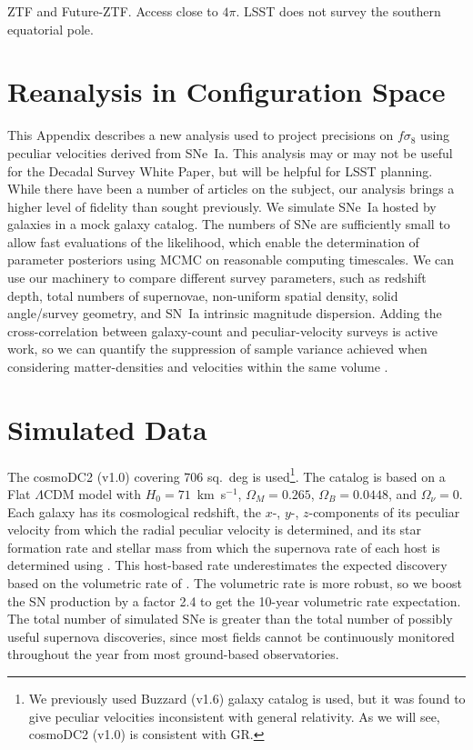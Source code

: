 \documentclass{aastex62}   	%
\begin{document}
ZTF and Future-ZTF.  Access close to $4\pi$.  LSST does not survey the southern equatorial pole.

\appendix
\section{Reanalysis in Configuration Space}

This Appendix describes a new analysis used to project precisions on $f\sigma_8$ using peculiar velocities derived from SNe~Ia.
This analysis may or may not be useful for the Decadal Survey White Paper, but will be helpful for LSST planning.
While there have been a number of articles on the subject,
our analysis brings a higher level of fidelity than sought previously.  We simulate SNe~Ia hosted by galaxies in a mock galaxy
catalog. The numbers of SNe are sufficiently small to allow fast evaluations of the likelihood, which enable the determination of parameter
posteriors using MCMC on reasonable computing timescales.   We can use our machinery to 
compare different survey parameters, such as redshift depth, total numbers of supernovae, non-uniform spatial density,
solid angle/survey geometry, and SN~Ia intrinsic magnitude dispersion.
Adding the cross-correlation between galaxy-count and peculiar-velocity surveys is active work, so we can
quantify the suppression of sample variance achieved when considering matter-densities and velocities 
within the same volume \citep{2007PhRvL..99h1301G}.

\section{Simulated Data}
The cosmoDC2 (v1.0) covering 706 sq.~deg is used\footnote{We previously used
Buzzard (v1.6) galaxy catalog is used, but it was found to give peculiar velocities inconsistent with general relativity.  As we will see,
cosmoDC2 (v1.0) is consistent with GR. }. 
The catalog is based on a Flat $\Lambda$CDM model with $H_0=71$~km~s$^{-1}$,  $\Omega_M=0.265$, $\Omega_B=0.0448$, and
$\Omega_\nu=0$.
Each galaxy has its cosmological redshift, the $x$-, $y$-, $z$-components of its peculiar velocity from which
the radial peculiar velocity is determined, and its
star formation rate and stellar mass from which the
supernova rate of each host is determined using 
\citet{2012ApJ...755...61S}.   This host-based rate
underestimates the expected discovery based on the volumetric
rate of \citet{2010ApJ...713.1026D}.  The volumetric rate is more robust, so  we boost the SN production
by a factor 2.4 to get the 10-year volumetric rate expectation. The total number of simulated SNe 
is greater than the total number of possibly useful supernova discoveries, since most fields cannot be continuously monitored throughout the year
from most ground-based observatories.
\end{document}
